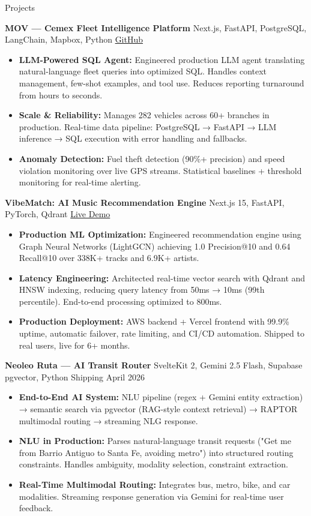 \documentclass{resume}
\begin{document}
\begin{rSection}{Projects}

\textbf{MOV — Cemex Fleet Intelligence Platform} {Next.js, FastAPI, PostgreSQL, LangChain, Mapbox, Python} \hfill \href{https://github.com/Fraga9/MOV-fleet}{GitHub}
\begin{itemize}
    \item \textbf{LLM-Powered SQL Agent:} Engineered production LLM agent translating natural-language fleet queries into optimized SQL. Handles context management, few-shot examples, and tool use. Reduces reporting turnaround from hours to seconds.
    \item \textbf{Scale \& Reliability:} Manages 282 vehicles across 60+ branches in production. Real-time data pipeline: PostgreSQL → FastAPI → LLM inference → SQL execution with error handling and fallbacks.
    \item \textbf{Anomaly Detection:} Fuel theft detection (90\%+ precision) and speed violation monitoring over live GPS streams. Statistical baselines + threshold monitoring for real-time alerting.
\end{itemize}

\textbf{VibeMatch: AI Music Recommendation Engine} {Next.js 15, FastAPI, PyTorch, Qdrant} \hfill \href{https://www.vibematchs.me/}{Live Demo}
\begin{itemize}
    \item \textbf{Production ML Optimization:} Engineered recommendation engine using Graph Neural Networks (LightGCN) achieving 1.0 Precision@10 and 0.64 Recall@10 over 338K+ tracks and 6.9K+ artists.
    \item \textbf{Latency Engineering:} Architected real-time vector search with Qdrant and HNSW indexing, reducing query latency from 50ms → 10ms (99th percentile). End-to-end processing optimized to 800ms.
    \item \textbf{Production Deployment:} AWS backend + Vercel frontend with 99.9\% uptime, automatic failover, rate limiting, and CI/CD automation. Shipped to real users, live for 6+ months.
\end{itemize}

\textbf{Neoleo Ruta — AI Transit Router} {SvelteKit 2, Gemini 2.5 Flash, Supabase pgvector, Python} \hfill {Shipping April 2026}
\begin{itemize}
    \item \textbf{End-to-End AI System:} NLU pipeline (regex + Gemini entity extraction) → semantic search via pgvector (RAG-style context retrieval) → RAPTOR multimodal routing → streaming NLG response.
    \item \textbf{NLU in Production:} Parses natural-language transit requests ("Get me from Barrio Antiguo to Santa Fe, avoiding metro") into structured routing constraints. Handles ambiguity, modality selection, constraint extraction.
    \item \textbf{Real-Time Multimodal Routing:} Integrates bus, metro, bike, and car modalities. Streaming response generation via Gemini for real-time user feedback.
\end{itemize}


\end{rSection}
\end{document}
